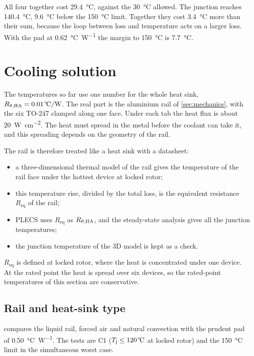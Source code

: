 All four together cost \SI{29.4}{\celsius}, against the \SI{30}{\celsius}
allowed. The junction reaches \SI{140.4}{\celsius}, \SI{9.6}{\celsius} below
the \SI{150}{\celsius} limit. Together they cost \SI{3.4}{\celsius} more than
their sum, because the loop between loss and temperature acts on a larger
loss. With the pad at \SI{0.62}{\celsius\per\watt} the margin to \SI{150}{\celsius} is
\SI{7.7}{\celsius}.

\section{Cooling solution}
\label{sec:cooling}

The temperatures so far use one number for the whole heat sink,
$\Rthha = \SI{0.01}{\celsius\per\watt}$. The real part is the aluminium rail
of \cref{sec:mechanics}, with the six TO-247 clamped along one face. Under
each tab the heat flux is about \SI{20}{\watt\per\centi\metre\squared}. The
heat must spread in the metal before the coolant can take it, and this
spreading depends on the geometry of the rail.

The rail is therefore treated like a heat sink with a datasheet:
\begin{itemize}
  \item a three-dimensional thermal model of the rail gives the temperature
        of the rail face under the hottest device at locked rotor;
  \item this temperature rise, divided by the total loss, is the equivalent
        resistance $R_\mathrm{eq}$ of the rail;
  \item PLECS uses $R_\mathrm{eq}$ as $R_{\theta,\mathrm{HA}}$, and the steady-state analysis
        gives all the junction temperatures;
  \item the junction temperature of the 3D model is kept as a check.
\end{itemize}
$R_\mathrm{eq}$ is defined at locked rotor, where the heat is concentrated
under one device. At the rated point the heat is spread over six devices, so
the rated-point temperatures of this section are conservative.

\subsection{Rail and heat-sink type}

 compares the liquid rail, forced air and natural
convection with the prudent pad of \SI{0.50}{\celsius\per\watt}. The tests
are C1 ($\Tj \leq \SI{120}{\celsius}$ at locked rotor) and the
\SI{150}{\celsius} limit in the simultaneous worst case.

